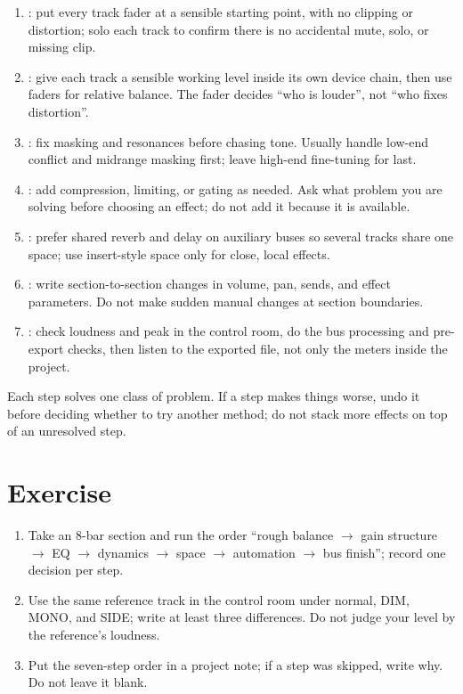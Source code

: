 \begin{enumerate}
  \item {}: put every track fader at a sensible starting point,
        with no clipping or distortion; solo each track to confirm there is no
        accidental mute, solo, or missing clip.
  \item {}: give each track a sensible working level inside its
        own device chain, then use faders for relative balance. The fader decides
        ``who is louder'', not ``who fixes distortion''.
  \item {}: fix masking and resonances before chasing tone. Usually handle
        low-end conflict and midrange masking first; leave high-end fine-tuning for
        last.
  \item {}: add compression, limiting, or gating as needed. Ask what
        problem you are solving before choosing an effect; do not add it because
        it is available.
  \item {}: prefer shared reverb and delay on auxiliary buses so several
        tracks share one space; use insert-style space only for close, local effects.
  \item {}: write section-to-section changes in volume, pan, sends,
        and effect parameters. Do not make sudden manual changes at section
        boundaries.
  \item {}: check loudness and peak in the control room, do the
        bus processing and pre-export checks, then listen to the exported file,
        not only the meters inside the project.
\end{enumerate}

Each step solves one class of problem. If a step makes things worse, undo it before
deciding whether to try another method; do not stack more effects on top of an
unresolved step.

\section{Exercise}


\begin{exercise}
\begin{enumerate}
  \item Take an 8-bar section and run the order ``rough balance $\to$ gain structure $\to$ EQ $\to$ dynamics $\to$ space $\to$ automation $\to$ bus finish''; record one decision per step.
  \item Use the same reference track in the control room under normal, DIM, MONO, and SIDE; write at least three differences. Do not judge your level by the reference's loudness.
  \item Put the seven-step order in a project note; if a step was skipped, write why. Do not leave it blank.
\end{enumerate}
\end{exercise}

